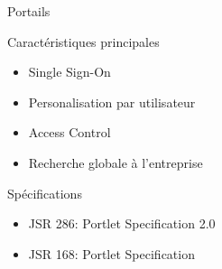 
\begin{frame}{Portails}
  \begin{block}{Caractéristiques principales}
    \begin{itemize}
      \item Single Sign-On
      \item Personalisation par utilisateur %
      \item Access Control
      \item Recherche globale à l'entreprise
    \end{itemize}
  \end{block}

  \begin{block}{Spécifications}
    \begin{itemize}
      \item JSR 286: Portlet Specification 2.0
      \item JSR 168: Portlet Specification
    \end{itemize}
  \end{block}

\end{frame}
